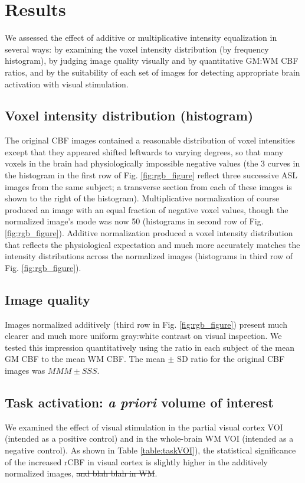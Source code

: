 \section{Results}
We assessed the effect of additive or multiplicative intensity equalization in several ways: by examining the voxel intensity distribution (by frequency histogram), by judging image quality visually and by quantitative GM:WM CBF ratios, and by the suitability of each set of images for detecting appropriate brain activation with visual stimulation.

\subsection{Voxel intensity distribution (histogram)}
The original CBF images contained a reasonable distribution of voxel intensities except that they appeared shifted leftwards to varying degrees, so that many voxels in the brain had physiologically impossible negative values (the 3 curves in the histogram in the first row of Fig. \ref{fig:rgb_figure} reflect three successive ASL images from the same subject; a transverse section from each of these images is shown to the right of the histogram). Multiplicative normalization of course produced an image with an equal fraction of negative voxel values, though the normalized image's mode was now 50 (histograms in second row of Fig. \ref{fig:rgb_figure}). Additive normalization produced a voxel intensity distribution that reflects the physiological expectation and much more accurately matches the intensity distributions across the normalized images (histograms in third row of Fig. \ref{fig:rgb_figure}). 

\subsection{Image quality}
Images normalized additively (third row in Fig. \ref{fig:rgb_figure}) present much clearer and much more uniform gray:white contrast on visual inspection. We tested this impression quantitatively using the ratio in each subject of the mean GM CBF to the mean WM CBF. The mean $\pm$ SD ratio for the original CBF images was $MMM \pm SSS$.

\subsection{Task activation: \textit{a priori} volume of interest}
We examined the effect of visual stimulation in the partial visual cortex VOI (intended as a positive control) and in the whole-brain WM VOI (intended as a negative control). As shown in Table \ref{table:taskVOI}), the statistical significance of the increased rCBF in visual cortex is slightly higher in the additively normalized images, \sout{and blah blah in WM}.

